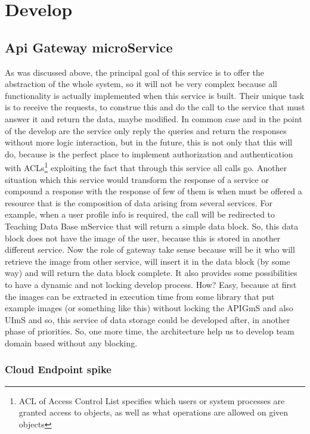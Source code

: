 \chapter{Develop}


\section{Api Gateway microService}

As was discussed above, the principal goal of this service is to offer the
abstraction of the whole system, so it will not be very complex because all
functionality is actually implemented when this service is built.
\intro
Their unique task is to receive the requests, to construe this and do the call
to the service that must answer it and return the data,
maybe modified.
In common case and in the point of the develop are the service only
reply the queries and return the responses without more logic interaction, but
in the future, this is not only that this will do, because is the perfect place
to implement authorization and authentication with ACLs\footnote{ACL of Access Control List
specifies which users or system processes are granted access to objects, as well
as what operations are allowed on given objects} exploiting the fact that through
this service all calls go.
\intro
Another situation which this service would transform the response of a service or
compound a response with the response of few of them is when must be offered a
resource that is the composition of data arising from several services. For example,
when a user profile info is required, the call will be redirected to Teaching Data
Base mService that will return a simple data block. So, this data block does not
have the image of the user, because this is stored in another different service.
Now the role of gateway take sense because will be it who will retrieve the image
from other service, will insert it in the data block (by some way) and will return
the data block complete.
\intro
It also provides some possibilities to have a dynamic and not locking develop process.
How? Easy, because at first the images can be extracted in execution time from some
library that put example images (or something like this) without locking the APIGmS
and also UImS and so, this service of data storage could be developed after, in another
phase of priorities. So, one more time, the architecture help us to develop team domain
based without any blocking.


\subsection{Cloud Endpoint spike}

